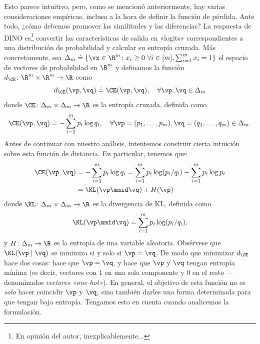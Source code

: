 \documentclass[../../book-main_es.tex]{subfiles}
\begin{document}
Esto parece intuitivo, pero, como se mencionó anteriormente, hay varias
consideraciones empíricas, incluso a la hora de definir la función de pérdida. Ante todo,
¿cómo debemos promover las similitudes y las diferencias? La
respuesta de DINO \citep{caron2021emerging} es\footnote{En
opinión del autor, inexplicablemente...} convertir las características de salida en
«logits» correspondientes a una distribución de probabilidad y calcular
su entropía cruzada. Más concretamente, sea \(\Delta_{m} \doteq \{\vx
        \in \R^{m} \colon x_{i} \geq 0\ \forall i \in [m], \sum_ {i =
1}^{m}x_{i} = 1\}\) el espacio de vectores de probabilidad en \(\R^{m}\)
y definamos la función \(d_{\CE} \colon \R^{m} \times \R^{m} \to \R\) como
\begin{equation}\label{eq:cross_entropy_difference}
    d_{\CE}(\vp, \vq) \doteq \CE(\vp, \vq), \quad \forall \vp, \vq
    \in \Delta_{m}
\end{equation}
donde \(\CE \colon \Delta_{m} \times \Delta_{m} \to \R\) es la
entropía cruzada, definida como
\begin{equation}\label{eq:expts_def_ce}
    \CE(\vp, \vq) \doteq -\sum_{i = 1}^{m}p_{i}\log q_{i}, \quad
    \forall \vp = (p_{1}, \dots, p_{m}), \vq = (q_{1}, \dots, q_{m})
    \in \Delta_{m}.
\end{equation}
Antes de continuar con nuestro análisis, intentemos construir cierta intuición sobre
esta función de distancia. En particular, tenemos que:
\begin{align}
    \CE(\vp, \vq)
    &= -\sum_{i = 1}^{m}p_{i}\log q_{i} = \sum_{i = 1}^{m}p_{i}\log(p_{i}/q_{i})
    - \sum_{i = 1}^{m}p_{i}\log p_{i} \\ 
    &= \KL(\vp\mmid \vq) + H(\vp)
\end{align}
donde \(\KL \colon \Delta_{m} \times \Delta_{m} \to \R\) es la divergencia de KL,
definida como
\begin{equation}
    \KL(\vp\mmid \vq) \doteq \sum_{i = 1}^{m}p_{i}\log(p_{i}/q_{i}),
\end{equation}
y \(H \colon \Delta_{m} \to \R\) es la entropía de una variable aleatoria. Obsérvese
que \(\KL(\vp\mid \vq)\) se minimiza si y solo si \(\vp = \vq\).
De modo que minimizar \(d_{\CE}\) hace dos cosas: hace que \(\vp = \vq\),
y hace que \(\vp\) y \(\vq\) tengan entropía mínima (es decir, vectores
    con \(1\) en una sola componente y \(0\) en el resto --- denominados
\textit{vectores «one-hot»}). En general, el objetivo de esta función no es \textit{solo} 
hacer coincidir \(\vp\) y \(\vq\), sino también darles una forma
determinada para que tengan baja entropía. Tengamos esto en cuenta cuando
analicemos la formulación.
\end{document}
